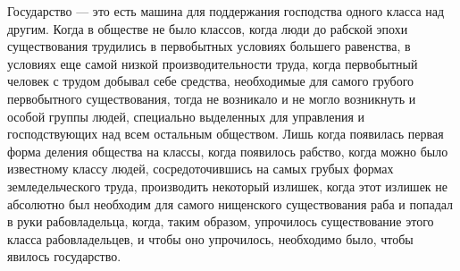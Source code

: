 \documentclass[12pt]{article}
\newcommand{\parnum}{(\arabic{parcount})}
\newcounter{parcount}
\newenvironment{parnumbers}{%
  \par%
  \everypar{\noindent \stepcounter{parcount}\marginpar[]{\parnum}}%
}{}
\begin{document}
\begin{parnumbers}
Государство — это есть машина для поддержания господства одного класса над другим. Когда в обществе не было классов, когда люди до рабской эпохи существования трудились в первобытных условиях большего равенства, в условиях еще самой низкой производительности труда, когда первобытный человек с трудом добывал себе средства, необходимые для самого грубого первобытного существования, тогда не возникало и не могло возникнуть и особой группы людей, специально выделенных для управления и господствующих над всем остальным обществом. Лишь когда появилась первая форма деления общества на классы, когда появилось рабство, когда можно было известному классу людей, сосредоточившись на самых грубых формах земледельческого труда, производить некоторый излишек, когда этот излишек не абсолютно был необходим для самого нищенского существования раба и попадал в руки рабовладельца, когда, таким образом, упрочилось существование этого класса рабовладельцев, и чтобы оно упрочилось, необходимо было, чтобы явилось государство.


\end{parnumbers}
\end{document}
